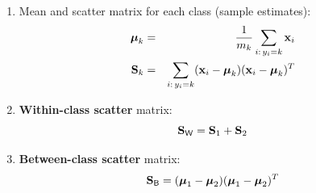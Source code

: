 	\begin{enumerate}
		\item Mean and scatter matrix for each class (sample estimates):
		      {\small
		      \begin{eqnarray*}
			      \bm{\mathrm{\mu}}_k &=& \frac{1}{m_k} \sum_{i:\, y_i = k} \bm{\mathrm{x}}_i \\
			      \mathbf{S}_k   &=& \sum_{i:\, y_i = k} (\bm{\mathrm{x}}_i - \bm{\mathrm{\mu}}_k) (\bm{\mathrm{x}}_i - \bm{\mathrm{\mu}}_k)^T
		      \end{eqnarray*}
		      }
		\item \textbf{Within-class scatter} matrix:
		      \begin{displaymath}
			      \mathbf{S}_{\mathsf{W}} = \mathbf{S}_1 + \mathbf{S}_2
		      \end{displaymath}
		\item \textbf{Between-class scatter} matrix:
		      \begin{displaymath}
			      \mathbf{S}_{\mathsf{B}} = (\bm{\mathrm{\mu}}_1 - \bm{\mathrm{\mu}}_2) (\bm{\mathrm{\mu}}_1 - \bm{\mathrm{\mu}}_2)^T
		      \end{displaymath}
	

\end{enumerate}
